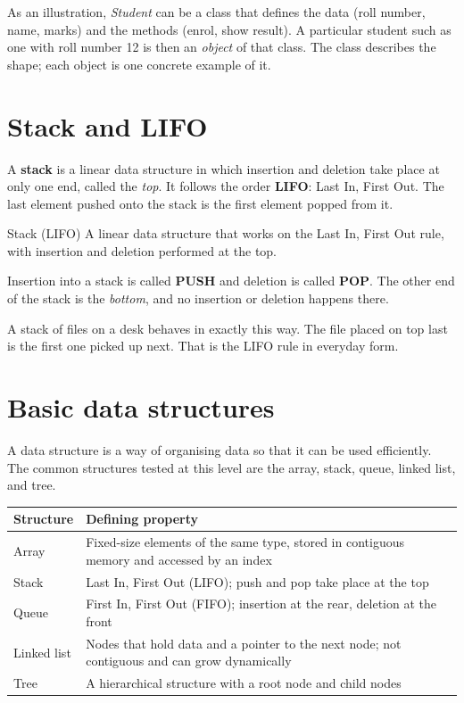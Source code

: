 As an illustration, \emph{Student} can be a class that defines the data
(roll number, name, marks) and the methods (enrol, show result). A particular
student such as one with roll number 12 is then an \emph{object} of that class.
The class describes the shape; each object is one concrete example of it.

\section{Stack and LIFO}
A \textbf{stack} is a linear data structure in which insertion and deletion
take place at only one end, called the \emph{top}. It follows the order
\textbf{LIFO}: Last In, First Out. The last element pushed onto the stack is
the first element popped from it.

\begin{definitionbox}{Stack (LIFO)}
A linear data structure that works on the Last In, First Out rule, with
insertion and deletion performed at the top.
\end{definitionbox}

Insertion into a stack is called \textbf{PUSH} and deletion is called
\textbf{POP}. The other end of the stack is the \emph{bottom}, and no
insertion or deletion happens there.

\begin{example}
A stack of files on a desk behaves in exactly this way. The file placed on top
last is the first one picked up next. That is the LIFO rule in everyday form.
\end{example}

\section{Basic data structures}
A data structure is a way of organising data so that it can be used
efficiently. The common structures tested at this level are the array, stack,
queue, linked list, and tree.

\begin{center}
\begin{tabular}{p{}p{}}
\toprule
\textbf{Structure} & \textbf{Defining property} \\
\midrule
Array & Fixed-size elements of the same type, stored in contiguous memory and accessed by an index \\
Stack & Last In, First Out (LIFO); push and pop take place at the top \\
Queue & First In, First Out (FIFO); insertion at the rear, deletion at the front \\
Linked list & Nodes that hold data and a pointer to the next node; not contiguous and can grow dynamically \\
Tree & A hierarchical structure with a root node and child nodes \\
\bottomrule
\end{tabular}
\end{center}

